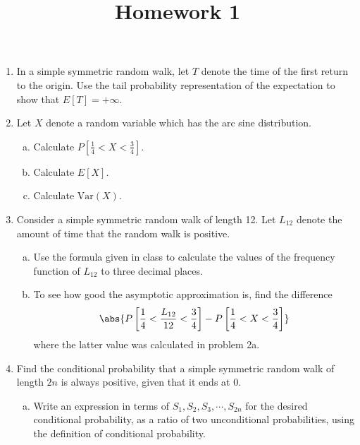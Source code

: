 \documentclass{article}
\newcommand{\var}{\mathrm{Var}}
\begin{document}
\title{Homework 1}
\maketitle
\thispagestyle{fancy}

\begin{enumerate}[(1)]
	\item In a simple symmetric random walk, let $T$ denote the time of the first return to the origin. Use the tail probability representation of the expectation to show that $E[T]=+\infty.$

	\item Let $X$ denote a random variable which has the arc sine distribution.

		\begin{enumerate}[(a)]
			\item Calculate $P\left[ \frac{1}{4}<X<\frac{3}{4} \right].$ 

			\item Calculate $E[X].$

			\item Calculate $\var(X).$
				
		\end{enumerate}

	\item Consider a simple symmetric random walk of length 12. Let $L_{12}$ denote the amount of time that the random walk is positive.

		\begin{enumerate}[(a)]
			\item Use the formula given in class to calculate the values of the frequency function of $L_{12}$ to three decimal places.

			\item To see how good the asymptotic approximation is, find the difference
				\[\abs{P\left[ \frac{1}{4}<\frac{L_{12}}{12}<\frac{3}{4} \right]-P\left[ \frac{1}{4}<X<\frac{3}{4} \right]}\]
				where the latter value was calculated in problem 2a.

		\end{enumerate}

	\item Find the conditional probability that a simple symmetric random walk of length $2n$ is always positive, given that it ends at 0.

		\begin{enumerate}[(a)]
			\item Write an expression in terms of $S_1, S_2, S_3, \cdots, S_{2n}$ for the desired conditional probability, as a ratio of two unconditional probabilities, using the definition of conditional probability.


\end{enumerate}
\end{enumerate}
\end{document}
